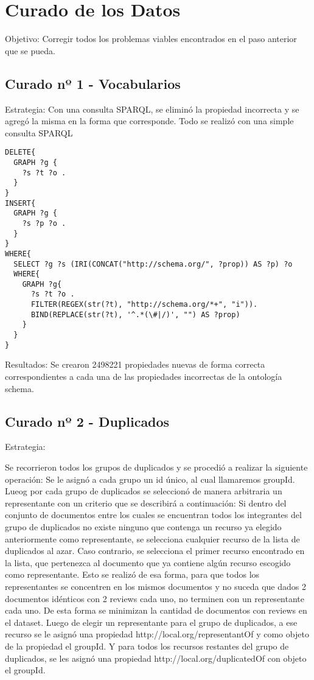 \chapter{Curado de los Datos}
\label{chapter:curado}

Objetivo:
Corregir todos los problemas viables encontrados en el paso anterior que se pueda.

\section{Curado nº 1 - Vocabularios}
\label{section:curado-vocabularios}

Estrategia:
Con una consulta SPARQL, se eliminó la propiedad incorrecta y se agregó la misma en la forma que corresponde.
Todo se realizó con una simple consulta SPARQL
\begin{lstlisting}[frame=single]  
DELETE{
  GRAPH ?g {
    ?s ?t ?o .
  }
}
INSERT{
  GRAPH ?g {
    ?s ?p ?o .
  }
}
WHERE{
  SELECT ?g ?s (IRI(CONCAT("http://schema.org/", ?prop)) AS ?p) ?o
  WHERE{
    GRAPH ?g{
      ?s ?t ?o .
      FILTER(REGEX(str(?t), "http://schema.org/*+", "i")).
      BIND(REPLACE(str(?t), '^.*(\#|/)', "") AS ?prop)
    }
  }
}
\end{lstlisting}


Resultados:
Se crearon 2498221 propiedades nuevas de forma correcta correspondientes a cada una de las propiedades incorrectas de la ontología 
schema.

\section{Curado nº 2 - Duplicados}
\label{section:curado-duplicados}

Estrategia: 

Se recorrieron todos los grupos de duplicados y se procedió a realizar la siguiente operación:
Se le asignó a cada grupo un id único, al cual llamaremos groupId.
Lueog por cada grupo de duplicados se seleccionó de manera arbitraria un representante con un criterio que se describirá a continuación:
Si dentro del conjunto de documentos entre los cuales se encuentran todos los integrantes del grupo de duplicados no existe ninguno 
que contenga un recurso ya elegido anteriormente como representante, se selecciona cualquier recurso de la lista de duplicados al azar.
Caso contrario, se selecciona el primer recurso encontrado en la lista, que pertenezca al documento que ya contiene algún recurso escogido 
como representante.
Esto se realizó de esa forma, para que todos los representantes se concentren en los mismos documentos y no suceda que dados 2 
documentos idénticos con 2 reviews cada uno, no terminen con un representante cada uno. De esta forma se minimizan la cantidad de 
documentos con reviews en el dataset.
Luego de elegir un representante para el grupo de duplicados, a ese recurso se le asignó una propiedad http://local.org/representantOf y 
como objeto de la propiedad el groupId.
Y para todos los recursos restantes del grupo de duplicados, se les asignó una propiedad http://local.org/duplicatedOf con objeto 
el groupId.

